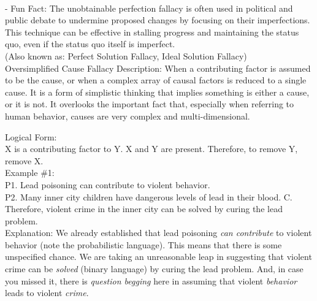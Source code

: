 \documentclass[a4paper,12pt,single,pdftex]{scrbook}
\begin{document}
    
      
    \\

    
      - Fun Fact: The unobtainable perfection fallacy is often used in political and public debate to undermine proposed changes by focusing on their imperfections. This technique can be effective in stalling progress and maintaining the status quo, even if the status quo itself is imperfect.
    \\

  
    
      (Also known as: Perfect Solution Fallacy, Ideal Solution Fallacy)
    \\

  

Oversimplified Cause Fallacy
    Description: When a contributing factor is assumed to be the cause, or when a complex array of causal factors is reduced to a single cause. It is a form of simplistic thinking that implies something is either a cause, or it is not. It overlooks the important fact that, especially when referring to human behavior, causes are very complex and multi-dimensional.

    
      Logical Form:
    \\

    
      X is a contributing factor to Y. \newline
X and Y are present. \newline
Therefore, to remove Y, remove X.
    \\

    
      Example \#1:
    \\

    
      P1. Lead poisoning can contribute to violent behavior.
    \\

    
      P2. Many inner city children have dangerous levels of lead in their blood. \newline
C. Therefore, violent crime in the inner city can be solved  by curing the lead problem.
    \\

    
      Explanation: We already established that lead poisoning {\it can contribute} to violent behavior (note the probabilistic language). This means that there is some unspecified chance. We are taking an unreasonable leap in suggesting that violent crime can be {\it solved}  (binary language) by curing the lead problem. And, in case you missed it, there is {\it question begging} here in assuming that violent {\it behavior} leads to violent {\it crime}.
    \\
\end{document}
